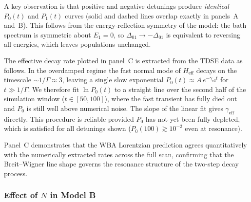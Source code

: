 \documentclass[aps,prx,reprint,showpacs,showkeys,floatfix]{revtex4-2}
\begin{document}
A key observation is that positive and negative detunings produce
\emph{identical} $P_0(t)$ and $P_1(t)$ curves (solid and dashed lines
overlap exactly in panels~A and~B).  This follows from the energy-reflection
symmetry of the model: the bath spectrum is symmetric about $E_1=0$, so
$\Delta_{01}\to-\Delta_{01}$ is equivalent to reversing all energies,
which leaves populations unchanged.

The effective decay rate plotted in panel~C is extracted from the TDSE data
as follows.  In the overdamped regime the fast normal mode of $H_\mathrm{eff}$
decays on the timescale $\sim 1/\Gamma \approx 3$, leaving a single
slow exponential $P_0(t)\approx A\,e^{-\gamma_\mathrm{eff}t}$ for $t \gg 1/\Gamma$.
We therefore fit $\ln P_0(t)$ to a straight line over the second half of
the simulation window ($t\in[50,100]$), where the fast transient has fully
died out and $P_0$ is still well above numerical noise.
The slope of the linear fit gives $\gamma_\mathrm{eff}$ directly.
This procedure is reliable provided $P_0$ has not yet been fully depleted,
which is satisfied for all detunings shown ($P_0(100)\gtrsim10^{-2}$ even
at resonance).

Panel~C demonstrates that the WBA Lorentzian prediction agrees quantitatively
with the numerically extracted rates across the full scan, confirming that
the Breit--Wigner line shape governs the resonance structure of the two-step
decay process.

\subsubsection{Effect of $N$ in Model B}
\end{document}
